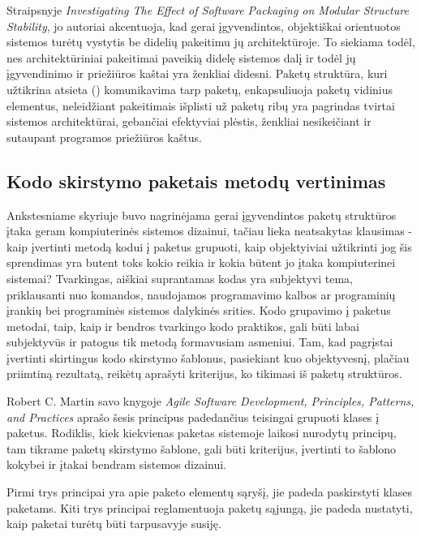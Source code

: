 Straipsnyje \textit{Investigating The Effect of Software Packaging on Modular Structure Stability}, jo autoriai akcentuoja, kad
gerai įgyvendintos, objektiškai orientuotos sistemos turėtų vystytis be didelių pakeitimu jų architektūroje.
To siekiama todėl, nes architektūriniai pakeitimai paveikią didelę sistemos dalį ir todėl
jų įgyvendinimo ir priežiūros kaštai yra ženkliai didesni\cite{ModularStability}.
Paketų struktūra, kuri užtikrina atsieta () komunikavima tarp paketų, enkapsuliuoja paketų vidinius elementus, neleidžiant pakeitimais
išplisti už paketų ribų yra pagrindas tvirtai sistemos architektūrai, gebančiai efektyviai plėstis, ženkliai nesikeičiant ir sutaupant programos priežiūros kaštus.

\subsection{Kodo skirstymo paketais metodų vertinimas}
Ankstesniame skyriuje buvo nagrinėjama gerai įgyvendintos paketų struktūros įtaka geram kompiuterinės sistemos dizainui,
tačiau lieka neatsakytas klausimas - kaip įvertinti metodą kodui į paketus grupuoti, kaip objektyiviai užtikrinti
jog šis sprendimas yra butent toks kokio reikia ir kokia būtent jo įtaka kompiuterinei sistemai?
Tvarkingas, aiškiai suprantamas kodas yra subjektyvi tema, priklausanti nuo komandos,
naudojamos programavimo kalbos ar programinių įrankių bei programinės sistemos dalykinės srities.
Kodo grupavimo į paketus metodai, taip, kaip ir bendros tvarkingo kodo praktikos,
gali būti labai subjektyvūs ir patogus tik metodą formavusiam asmeniui.
Tam, kad pagrįstai įvertinti skirtingus kodo skirstymo šablonus, pasiekiant kuo objektyvesnį,
plačiau priimtiną rezultatą, reikėtų aprašyti kriterijus, ko tikimasi iš paketų struktūros.

Robert C. Martin savo knygoje \textit{Agile Software Development, Principles, Patterns, and Practices} aprašo
šesis principus padedančius teisingai grupuoti klases į paketus.
Rodiklis, kiek kiekvienas paketas sistemoje laikosi nurodytų principų, tam tikrame paketų skirstymo šablone, gali
būti kriterijus, įvertinti to šablono kokybei ir įtakai bendram sistemos dizainui.

Pirmi trys principai yra apie paketo elementų sąryšį, jie padeda paskirstyti klases paketams\cite{AgileSoftwareDevelopment}.
Kiti trys principai reglamentuoja paketų sąjungą, jie padeda nustatyti, kaip paketai turėtų būti tarpusavyje susiję.

